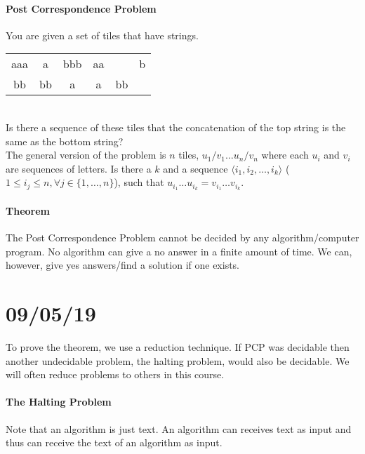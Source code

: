 \documentclass[12 pt]{article}
\begin{document}
\paragraph{Post Correspondence Problem} \label{pcp}You are given a set of tiles
that have strings.
\\
\begin{tabular}{|c| c| c| c| c |c|}
  \hline aaa&a&bbb&aa&&b
  \\ bb & bb & a & a & bb &
  \\ \hline
\end{tabular}
\\ Is there a sequence of these tiles that the concatenation of the
top string is the same as the bottom string?
\\ The general version of the problem is $n$ tiles, $u_1/v_1 \ldots
u_n/v_n$ where each $u_i$ and $v_i$ are sequences of letters. Is there
a $k$ and a sequence $\langle i_1, i_2, \ldots, i_k \rangle$ ($1 \leq
i_j \leq n, \forall j \in \{1,\ldots,n\}$), such that $u_{i_1} \ldots
u_{i_k} = v_{i_1} \ldots v_{i_k}$.
\paragraph{Theorem} The Post Correspondence Problem cannot be decided by any
algorithm/computer program. No algorithm can give a no answer in a
finite amount of time. We can, however, give yes answers/find a
solution if one exists.
\section{09/05/19}
To prove the theorem, we use a reduction technique. If PCP was
decidable then another undecidable problem, the halting problem, would
also be decidable. We will often reduce problems to others in this
course.
\paragraph{The Halting Problem}
Note that an algorithm is just text. An algorithm can receives text as
input and thus can receive the text of an algorithm as input.
\end{document}
